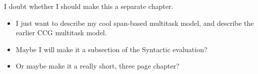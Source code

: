 I doubt whether I should make this a separate chapter.
\begin{itemize}
  \item I just want to describe my cool span-based multitask model, and describe the earlier CCG multitask model.
  \item Maybe I will make it a subsection of the Syntactic evaluation?
  \item Or maybe make it a really short, three page chapter?
\end{itemize}
